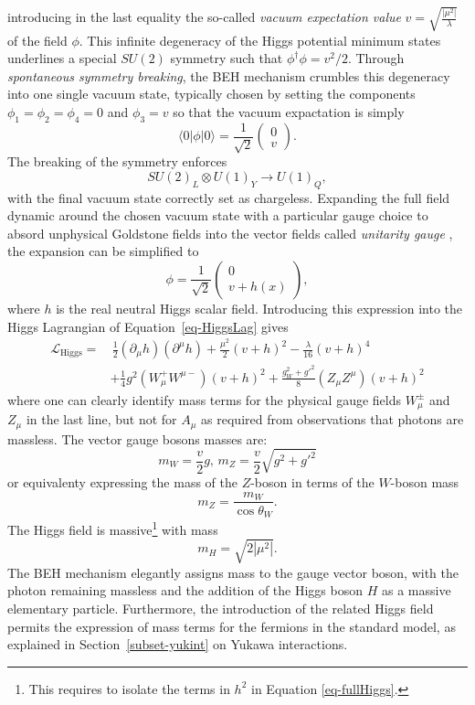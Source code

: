 introducing in the last equality the so-called \textit{vacuum expectation value} $v = \sqrt{\frac{|\mu^2|}{\lambda}}$ of the field $\phi$. This infinite degeneracy of the Higgs potential minimum states underlines a special $SU(2)$ symmetry such that $\phi^{\dagger} \phi = v^2/2$. Through \textit{spontaneous symmetry breaking}, the BEH mechanism crumbles this degeneracy into one single vacuum state, typically chosen by setting the components $\phi_1 = \phi_2 = \phi_4 = 0$ and $\phi_3 = v$ so that the vacuum expactation is simply
\begin{equation}
\langle0|\phi|0 \rangle = \frac{1}{\sqrt{2}} \begin{pmatrix}
        0\\ 
        v
    \end{pmatrix}.
\end{equation}
The breaking of the symmetry enforces \[ SU(2)_L \otimes U(1)_Y \rightarrow U(1)_Q,\] with the final vacuum state correctly set as chargeless. Expanding the full field dynamic around the chosen vacuum state with a particular gauge choice to absord unphysical Goldstone fields into the vector fields called \textit{unitarity gauge} \cite{PhysRevD.7.1068}, the expansion can be simplified to 
\begin{equation}
    \phi = \frac{1}{\sqrt{2}} \begin{pmatrix}
            0\\ 
            v + h(x)
        \end{pmatrix},
\end{equation}
where $h$ is the real neutral Higgs scalar field. Introducing this expression into the Higgs Lagrangian of Equation~\ref{eq-HiggsLag} gives
\begin{equation}\label{eq-fullHiggs}
    \begin{split}
        \mathcal{L}_{\text{Higgs}} = & \,\frac{1}{2} (\partial_\mu h)(\partial^\mu h) + \frac{\mu^2}{2}(v+h)^2  - \frac{\lambda}{16}(v+h)^4 \\
        &+ \frac{1}{4} g^2 (W_{\mu}^+W^{\mu-})(v+h)^2 + \frac{g^2_W + {g'}^2}{8}(Z_{\mu}Z^{\mu})(v+h)^2 
    \end{split}
\end{equation}
where one can clearly identify mass terms for the physical gauge fields $W_{\mu}^{\pm}$ and $Z_\mu$ in the last line, but not for $A_{\mu}$ as required from observations that photons are massless. The vector gauge bosons masses are:
\begin{equation}
    m_W = \frac{v}{2} g , \, m_Z = \frac{v}{2}\sqrt{g^2 +g'^2} 
\end{equation}
or equivalenty expressing the mass of the $Z$-boson in terms of the $W$-boson mass \[m_Z = \frac{m_W}{\cos\theta_W}.\] The Higgs field is massive\footnote{This requires to isolate the terms in $h^2$ in Equation \ref{eq-fullHiggs}.} with mass \[m_H = \sqrt{2|\mu^2|}.\]
The BEH mechanism elegantly assigns mass to the gauge vector boson, with the photon remaining massless and the addition of the Higgs boson $H$ as a massive elementary particle. Furthermore, the introduction of the related Higgs field permits the expression of mass terms for the fermions in the standard model, as explained in Section~\ref{subset-yukint} on Yukawa interactions. 

